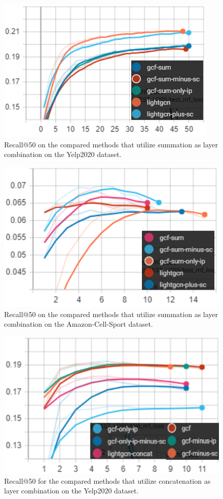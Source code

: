 \begin{figure}[h!]
    \includegraphics[width=\linewidth]{figures/gcf-sum-recall.png}
    \caption{Recall@50 on the compared methods that utilize summation as layer combination on the Yelp2020 dataset.}
    \label{fig:GCF-sum-recall-ablation-study}
\end{figure}

\begin{figure}[h!]
    \includegraphics[width=\linewidth]{figures/amazon-cell-sport-gcf-sum-recall.png}
    \caption{Recall@50 on the compared methods that utilize summation as layer combination on the Amazon-Cell-Sport dataset.}
    \label{fig:GCF-sum-recall-ablation-study-Amazon-Cell-Sport}
\end{figure}

\begin{figure}[h!]
    \includegraphics[width=\linewidth]{figures/gcf-concat-recall.png}
    \caption{Recall@50 for the compared methods that utilize concatenation as layer combination on the Yelp2020 dataset.}
    \label{fig:GCF-recall-concat-ablation-study}
\end{figure}